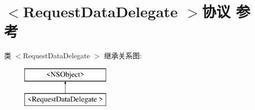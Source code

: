 \hypertarget{protocol_request_data_delegate_01-p}{}\section{$<$Request\+Data\+Delegate $>$协议 参考}
\label{protocol_request_data_delegate_01-p}
类 $<$Request\+Data\+Delegate $>$ 继承关系图\+:\begin{figure}[H]
\begin{center}
\leavevmode
\includegraphics[height=2.000000cm]{protocol_request_data_delegate_01-p}
\end{center}
\end{figure}
